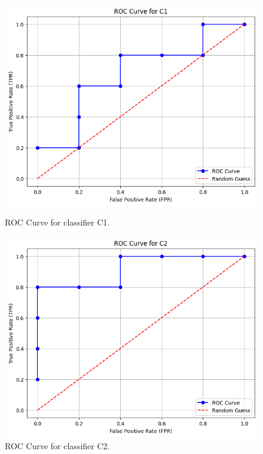 \begin{figure}[h]
    \centering
    \begin{minipage}{0.49\textwidth}
        \centering
        \includegraphics[width=\textwidth]{media/hw5_q1_c1.png}
        \caption{ROC Curve for classifier C1.}
    \end{minipage}
    \hfill
    \begin{minipage}{0.49\textwidth}
        \centering
        \includegraphics[width=\textwidth]{media/hw5_q1_c2.png}
        \caption{ROC Curve for classifier C2.}
    \end{minipage}
\end{figure}


